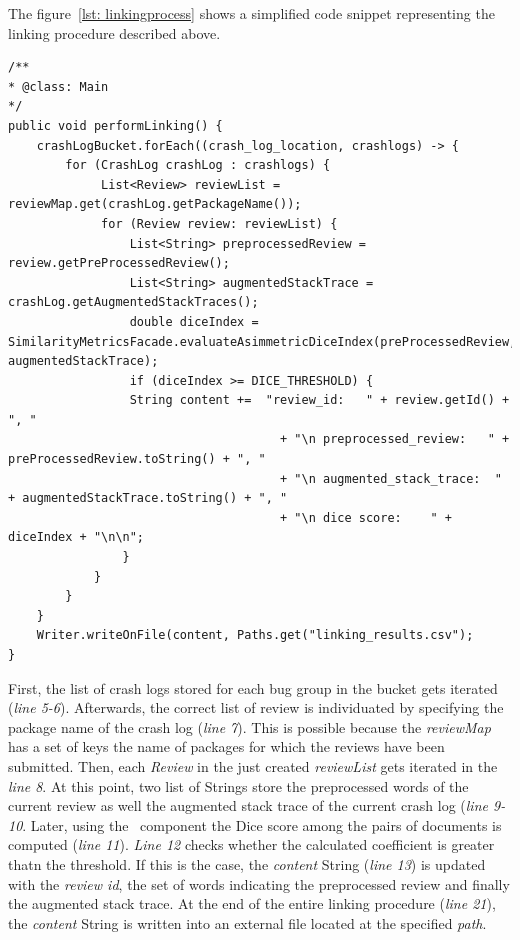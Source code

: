 The figure~\ref{lst: linkingprocess} shows a simplified code snippet representing the linking procedure described above. 
\begin{lstlisting}[caption=Linking process,label={lst: linkingprocess}]
/**
* @class: Main
*/
public void performLinking() {
	crashLogBucket.forEach((crash_log_location, crashlogs) -> {
		for (CrashLog crashLog : crashlogs) {
			 List<Review> reviewList = reviewMap.get(crashLog.getPackageName());
			 for (Review review: reviewList) {
			 	 List<String> preprocessedReview = review.getPreProcessedReview();	
			 	 List<String> augmentedStackTrace = crashLog.getAugmentedStackTraces();
			 	 double diceIndex = SimilarityMetricsFacade.evaluateAsimmetricDiceIndex(preProcessedReview, augmentedStackTrace);
			 	 if (diceIndex >= DICE_THRESHOLD) {	 
			 	 String content +=	"review_id:   " + review.getId() + ", "
	                                  + "\n preprocessed_review:   " + preProcessedReview.toString() + ", "
	                                  + "\n augmented_stack_trace:  " + augmentedStackTrace.toString() + ", "
	                                  + "\n dice score:    " + diceIndex + "\n\n";                     
			 	}
			}
		}
	}
	Writer.writeOnFile(content, Paths.get("linking_results.csv");
}
\end{lstlisting}
First, the list of crash logs stored for each bug group in the bucket gets iterated (\textit{line 5-6}). 
Afterwards, the correct list of review is individuated by specifying the package name of the crash log (\textit{line 7}). This is possible because the \textit{reviewMap} has a set of keys the name of packages for which the reviews have been submitted. 
Then, each \textit{Review} in the just created \textit{reviewList} gets iterated in the \textit{line 8}.
At this point, two list of Strings store the preprocessed words of the current review as well the augmented stack trace of the current crash log (\textit{line 9-10}.
Later, using the \Facade\ component the Dice score among the pairs of documents is computed (\textit{line 11}). 
\textit{Line 12} checks whether the calculated coefficient is greater thatn the threshold. 
If this is the case, the \textit{content} String (\textit{line 13}) is updated with 
the \textit{review id}, the set of words indicating the preprocessed review and finally the augmented stack trace. 
At the end of the entire linking procedure (\textit{line 21}), the \textit{content} String is written into an external file located at the specified \textit{path}.

